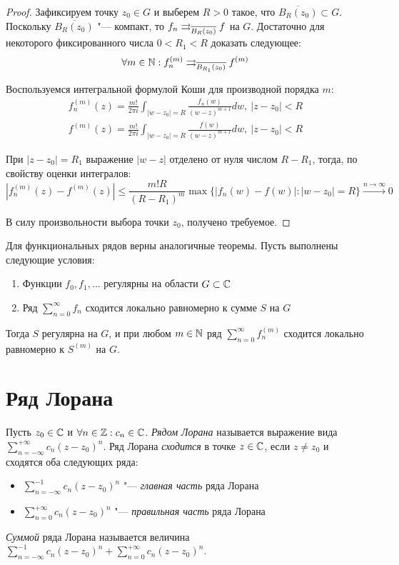 \begin{proof}
	Зафиксируем точку $z_0 \in G$ и выберем $R > 0$ такое, что $\overline{B_R(z_0)} \subset G$. Поскольку $\overline{B_R(z_0)}$ "--- компакт, то $f_n \rightrightarrows_{\overline{B_R(z_0)}} f$ на $G$. Достаточно для некоторого фиксированного числа $0 < R_1 < R$ доказать следующее:
	\[\forall m \in \mathbb{N}: f_n^{(m)} \rightrightarrows_{\overline{B_{R_1}(z_0)}} f^{(m)}\]
	
	Воспользуемся интегральной формулой Коши для производной порядка $m$:
	\begin{gather*}
		f_n^{(m)}(z) = \frac{m!}{2\pi i}\int_{|w - z_0| = R}\frac{f_n(w)}{(w - z)^{m+1}}dw,~|z - z_0| < R\\
		f^{(m)}(z) = \frac{m!}{2\pi i}\int_{|w - z_0| = R}\frac{f(w)}{(w - z)^{m+1}}dw,~|z - z_0| < R
	\end{gather*}
	
	При $|z - z_0| = R_1$ выражение $|w - z|$ отделено от нуля числом $R - R_1$, тогда, по свойству оценки интегралов:
	\[|f_n^{(m)}(z) - f^{(m)}(z)| \le \frac{m!R}{(R - R_1)^m}\max\{|f_n(w) - f(w)| : |w - z_0| = R\} \xrightarrow{n \to \infty} 0\]
	
	В силу произвольности выбора точки $z_0$, получено требуемое.
\end{proof}

\begin{note}
	Для функциональных рядов верны аналогичные теоремы. Пусть выполнены следующие условия:
	\begin{enumerate}
		\item Функции $f_0, f_1, \dotsc$ регулярны на области $G \subset \mathbb{C}$
		\item Ряд $\sum_{n=0}^\infty f_n$ сходится локально равномерно к сумме $S$ на $G$
	\end{enumerate}
	
	Тогда $S$ регулярна на $G$, и при любом $m \in \mathbb{N}$ ряд $\sum_{n=0}^\infty f_n^{(m)}$ сходится локально равномерно к $S^{(m)}$ на $G$.
\end{note}

\section{Ряд Лорана}

\begin{definition}
	Пусть $z_0 \in \mathbb{C}$ и $\forall n \in \mathbb{Z}: c_n \in \mathbb{C}$. \textit{Рядом Лорана} называется выражение вида $\sum_{n = -\infty}^{+\infty}c_n(z - z_0)^n$. Ряд Лорана \textit{сходится} в точке $z \in \mathbb{C}$, если $z \ne z_0$ и сходятся оба следующих ряда:
	\begin{itemize}
		\item $\sum_{n = -\infty}^{-1}c_n(z - z_0)^n$ "--- \textit{главная часть} ряда Лорана
		\item $\sum_{n = 0}^{+\infty}c_n(z - z_0)^n$ "--- \textit{правильная часть} ряда Лорана
	\end{itemize}
	
	\textit{Суммой} ряда Лорана называется величина $\sum_{n = -\infty}^{-1}c_n(z - z_0)^n + \sum_{n = 0}^{+\infty}c_n(z - z_0)^n$.
\end{definition}

